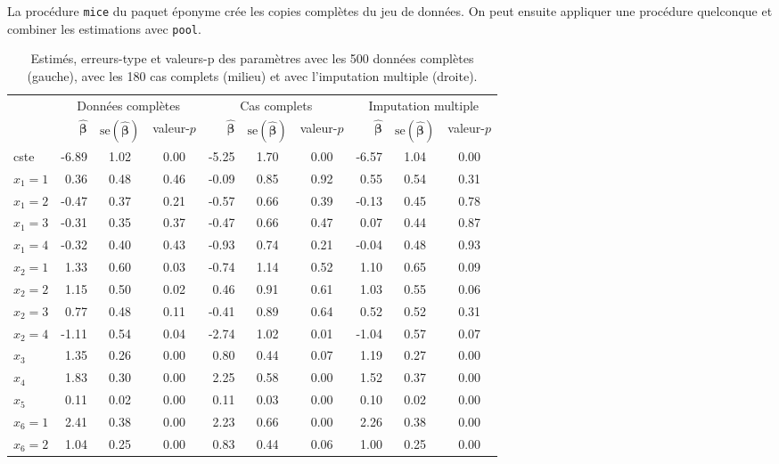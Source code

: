 \documentclass[
  11pt,
  letterpaper,
]{scrbook}
\theoremstyle{definition}
\theoremstyle{remark}
\begin{document}
La procédure \texttt{mice} du paquet éponyme crée les copies complètes
du jeu de données. On peut ensuite appliquer une procédure quelconque et
combiner les estimations avec \texttt{pool}.

\hypertarget{tbl-missing3r}{}
\begin{table}
\caption{\label{tbl-missing3r}Estimés, erreurs-type et valeurs-p des paramètres avec les 500 données
complètes (gauche), avec les 180 cas complets (milieu) et avec
l'imputation multiple (droite). }\tabularnewline

\centering
\begin{tabular}{lrccrccrcc}
\toprule
\multicolumn{1}{c}{} & \multicolumn{3}{c}{Données complètes} & \multicolumn{3}{c}{Cas complets} & \multicolumn{3}{c}{Imputation multiple} \\
\cmidrule(l{3pt}r{3pt}){2-4} \cmidrule(l{3pt}r{3pt}){5-7} \cmidrule(l{3pt}r{3pt}){8-10}
  & \(\widehat{\boldsymbol{\beta}}\) & \(\mathrm{se}(\widehat{\boldsymbol{\beta}})\) & valeur-\(p\) & \(\widehat{\boldsymbol{\beta}}\) & \(\mathrm{se}(\widehat{\boldsymbol{\beta}})\) & valeur-\(p\) & \(\widehat{\boldsymbol{\beta}}\) & \(\mathrm{se}(\widehat{\boldsymbol{\beta}})\) & valeur-\(p\)\\
\midrule
cste & -6.89 & 1.02 & 0.00 & -5.25 & 1.70 & 0.00 & -6.57 & 1.04 & 0.00\\
\(x_1=1\) & 0.36 & 0.48 & 0.46 & -0.09 & 0.85 & 0.92 & 0.55 & 0.54 & 0.31\\
\(x_1=2\) & -0.47 & 0.37 & 0.21 & -0.57 & 0.66 & 0.39 & -0.13 & 0.45 & 0.78\\
\(x_1=3\) & -0.31 & 0.35 & 0.37 & -0.47 & 0.66 & 0.47 & 0.07 & 0.44 & 0.87\\
\(x_1=4\) & -0.32 & 0.40 & 0.43 & -0.93 & 0.74 & 0.21 & -0.04 & 0.48 & 0.93\\
\addlinespace
\(x_2=1\) & 1.33 & 0.60 & 0.03 & -0.74 & 1.14 & 0.52 & 1.10 & 0.65 & 0.09\\
\(x_2=2\) & 1.15 & 0.50 & 0.02 & 0.46 & 0.91 & 0.61 & 1.03 & 0.55 & 0.06\\
\(x_2=3\) & 0.77 & 0.48 & 0.11 & -0.41 & 0.89 & 0.64 & 0.52 & 0.52 & 0.31\\
\(x_2=4\) & -1.11 & 0.54 & 0.04 & -2.74 & 1.02 & 0.01 & -1.04 & 0.57 & 0.07\\
\(x_3\) & 1.35 & 0.26 & 0.00 & 0.80 & 0.44 & 0.07 & 1.19 & 0.27 & 0.00\\
\addlinespace
\(x_4\) & 1.83 & 0.30 & 0.00 & 2.25 & 0.58 & 0.00 & 1.52 & 0.37 & 0.00\\
\(x_5\) & 0.11 & 0.02 & 0.00 & 0.11 & 0.03 & 0.00 & 0.10 & 0.02 & 0.00\\
\(x_6=1\) & 2.41 & 0.38 & 0.00 & 2.23 & 0.66 & 0.00 & 2.26 & 0.38 & 0.00\\
\(x_6=2\) & 1.04 & 0.25 & 0.00 & 0.83 & 0.44 & 0.06 & 1.00 & 0.25 & 0.00\\
\bottomrule
\end{tabular}
\end{table}
\end{document}
